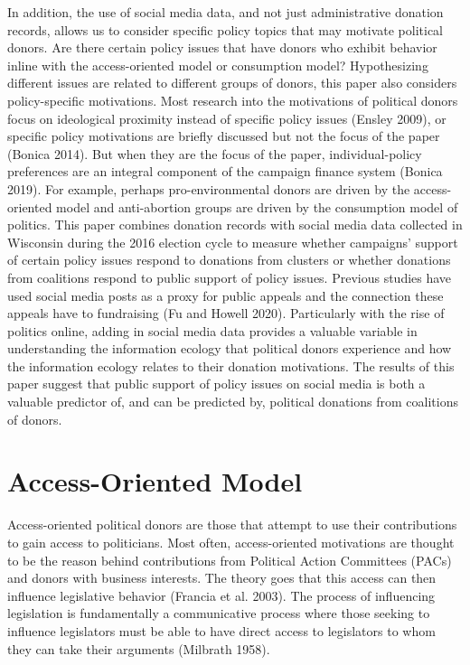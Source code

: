 \documentclass[12pt,]{article}
\begin{document}
In addition, the use of social media data, and not just administrative
donation records, allows us to consider specific policy topics that may
motivate political donors. Are there certain policy issues that have
donors who exhibit behavior inline with the access-oriented model or
consumption model? Hypothesizing different issues are related to
different groups of donors, this paper also considers policy-specific
motivations. Most research into the motivations of political donors
focus on ideological proximity instead of specific policy issues (Ensley
2009), or specific policy motivations are briefly discussed but not the
focus of the paper (Bonica 2014). But when they are the focus of the
paper, individual-policy preferences are an integral component of the
campaign finance system (Bonica 2019). For example, perhaps
pro-environmental donors are driven by the access-oriented model and
anti-abortion groups are driven by the consumption model of politics.
This paper combines donation records with social media data collected in
Wisconsin during the 2016 election cycle to measure whether campaigns'
support of certain policy issues respond to donations from clusters or
whether donations from coalitions respond to public support of policy
issues. Previous studies have used social media posts as a proxy for
public appeals and the connection these appeals have to fundraising (Fu
and Howell 2020). Particularly with the rise of politics online, adding
in social media data provides a valuable variable in understanding the
information ecology that political donors experience and how the
information ecology relates to their donation motivations. The results
of this paper suggest that public support of policy issues on social
media is both a valuable predictor of, and can be predicted by,
political donations from coalitions of donors.

\hypertarget{access-oriented-model}{%
\section{Access-Oriented Model}\label{access-oriented-model}}

Access-oriented political donors are those that attempt to use their
contributions to gain access to politicians. Most often, access-oriented
motivations are thought to be the reason behind contributions from
Political Action Committees (PACs) and donors with business interests.
The theory goes that this access can then influence legislative behavior
(Francia et al. 2003). The process of influencing legislation is
fundamentally a communicative process where those seeking to influence
legislators must be able to have direct access to legislators to whom
they can take their arguments (Milbrath 1958).
\end{document}
